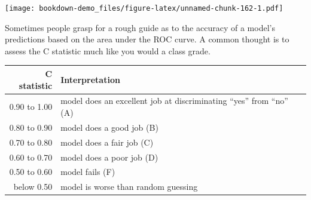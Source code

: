 \documentclass[]{book}
\theoremstyle{definition}
\theoremstyle{definition}
\theoremstyle{definition}
\theoremstyle{remark}
\begin{document}
\texttt{[image: bookdown-demo\_files/figure-latex/unnamed-chunk-162-1.pdf]}

Sometimes people grasp for a rough guide as to the accuracy of a model's
predictions based on the area under the ROC curve. A common thought is
to assess the C statistic much like you would a class grade.

\begin{longtable}[]{@{}rl@{}}
\toprule
\begin{minipage}[b]{0.16\columnwidth}\raggedleft\strut
C statistic\strut
\end{minipage} & \begin{minipage}[b]{0.60\columnwidth}\raggedright\strut
Interpretation\strut
\end{minipage}\tabularnewline
\midrule
\endhead
\begin{minipage}[t]{0.16\columnwidth}\raggedleft\strut
0.90 to 1.00\strut
\end{minipage} & \begin{minipage}[t]{0.60\columnwidth}\raggedright\strut
model does an excellent job at discriminating ``yes'' from ``no''
(A)\strut
\end{minipage}\tabularnewline
\begin{minipage}[t]{0.16\columnwidth}\raggedleft\strut
0.80 to 0.90\strut
\end{minipage} & \begin{minipage}[t]{0.60\columnwidth}\raggedright\strut
model does a good job (B)\strut
\end{minipage}\tabularnewline
\begin{minipage}[t]{0.16\columnwidth}\raggedleft\strut
0.70 to 0.80\strut
\end{minipage} & \begin{minipage}[t]{0.60\columnwidth}\raggedright\strut
model does a fair job (C)\strut
\end{minipage}\tabularnewline
\begin{minipage}[t]{0.16\columnwidth}\raggedleft\strut
0.60 to 0.70\strut
\end{minipage} & \begin{minipage}[t]{0.60\columnwidth}\raggedright\strut
model does a poor job (D)\strut
\end{minipage}\tabularnewline
\begin{minipage}[t]{0.16\columnwidth}\raggedleft\strut
0.50 to 0.60\strut
\end{minipage} & \begin{minipage}[t]{0.60\columnwidth}\raggedright\strut
model fails (F)\strut
\end{minipage}\tabularnewline
\begin{minipage}[t]{0.16\columnwidth}\raggedleft\strut
below 0.50\strut
\end{minipage} & \begin{minipage}[t]{0.60\columnwidth}\raggedright\strut
model is worse than random guessing\strut
\end{minipage}\tabularnewline
\bottomrule
\end{longtable}
\end{document}
